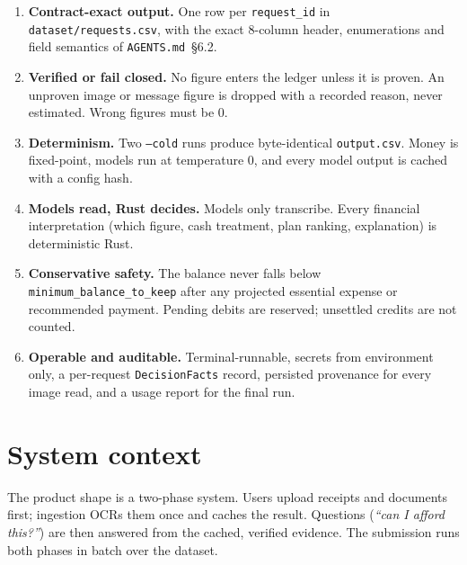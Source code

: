\documentclass[11pt,a4paper]{article}
\begin{document}
\begin{enumerate}[leftmargin=*,itemsep=2pt]
  \item \textbf{Contract-exact output.} One row per \texttt{request\_id} in \texttt{dataset/requests.csv}, with the
        exact 8-column header, enumerations and field semantics of \texttt{AGENTS.md}~\S6.2.
  \item \textbf{Verified or fail closed.} No figure enters the ledger unless it is proven. An unproven image or message
        figure is dropped with a recorded reason, never estimated. Wrong figures must be 0.
  \item \textbf{Determinism.} Two \texttt{--cold} runs produce byte-identical \texttt{output.csv}. Money is fixed-point,
        models run at temperature 0, and every model output is cached with a config hash.
  \item \textbf{Models read, Rust decides.} Models only transcribe. Every financial interpretation (which figure,
        cash treatment, plan ranking, explanation) is deterministic Rust.
  \item \textbf{Conservative safety.} The balance never falls below \texttt{minimum\_balance\_to\_keep} after any projected
        essential expense or recommended payment. Pending debits are reserved; unsettled credits are not counted.
  \item \textbf{Operable and auditable.} Terminal-runnable, secrets from environment only, a per-request
        \texttt{DecisionFacts} record, persisted provenance for every image read, and a usage report for the final run.
\end{enumerate}

\section{System context}

The product shape is a two-phase system. Users upload receipts and documents first; ingestion OCRs them once
and caches the result. Questions (\emph{``can I afford this?''}) are then answered from the cached, verified evidence.
The submission runs both phases in batch over the dataset.
\end{document}
